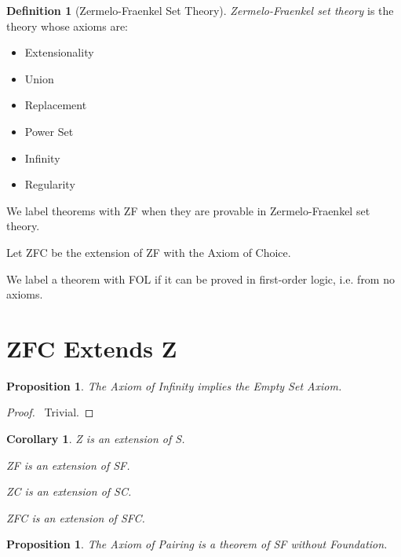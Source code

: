 \documentclass{book}
\let\qed\relax
\newtheorem{prop}[ax]{Proposition}
\newtheorem{cor}{Corollary}[ax]
\theoremstyle{definition}
\newtheorem{df}[ax]{Definition}
\begin{document}
\begin{df}[Zermelo-Fraenkel Set Theory]
\emph{Zermelo-Fraenkel set theory} is the theory whose axioms are:
\begin{itemize}
\item Extensionality
\item Union
\item Replacement
\item Power Set
\item Infinity
\item Regularity
\end{itemize}
We label theorems with ZF when they are provable in Zermelo-Fraenkel set theory.

Let ZFC be the extension of ZF with the Axiom of Choice.
\end{df}

We label a theorem with FOL if it can be proved in first-order logic, i.e. from no axioms.

\section{ZFC Extends Z}

\begin{prop}
The Axiom of Infinity implies the Empty Set Axiom.
\end{prop}

\begin{proof}
\pf\ Trivial. \qed
\end{proof}

\begin{cor}
Z is an extension of S.

ZF is an extension of SF.

ZC is an extension of SC.

ZFC is an extension of SFC.
\end{cor}

\begin{prop}
The Axiom of Pairing is a theorem of SF without Foundation.
\end{prop}
\end{document}
